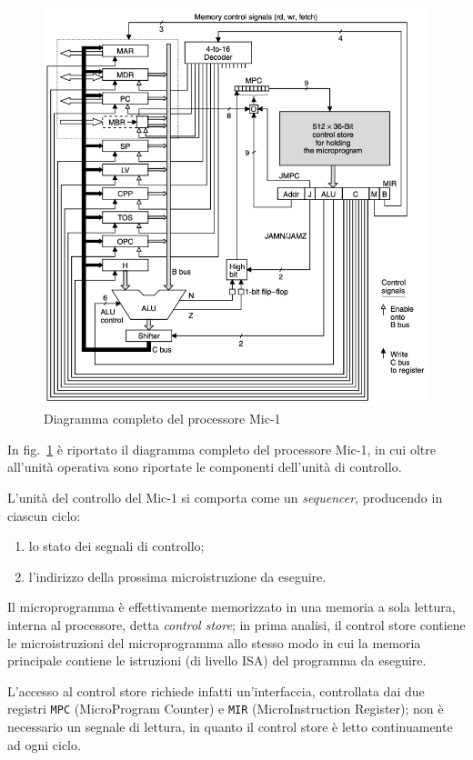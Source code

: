 \documentclass[a4paper,12pt]{scrreprt}
\begin{document}
\begin{figure}
  \centering
  \includegraphics[width=\textwidth]{mic1.png}
  \caption{Diagramma completo del processore Mic-1}\label{fig:mic1}
\end{figure}

In fig.~\ref{fig:mic1} è riportato il diagramma completo del processore Mic-1,
in cui oltre all'unità operativa sono riportate le componenti dell'unità di
controllo.

L'unità del controllo del Mic-1 si comporta come un \textit{sequencer},
producendo in ciascun ciclo:
\begin{enumerate}
  \item lo stato dei segnali di controllo;
  \item l'indirizzo della prossima microistruzione da eseguire.
\end{enumerate}

Il microprogramma è effettivamente memorizzato in una memoria a sola lettura,
interna al processore, detta \textit{control store}; in prima analisi, il
control store contiene le microistruzioni del microprogramma allo stesso modo in
cui la memoria principale contiene le istruzioni (di livello ISA) del programma
da eseguire.

L'accesso al control store richiede infatti un'interfaccia, controllata dai due
registri \lstinline{MPC} (MicroProgram Counter) e \lstinline{MIR}
(MicroInstruction Register); non è necessario un segnale di lettura, in quanto
il control store è letto continuamente ad ogni ciclo.
\end{document}
